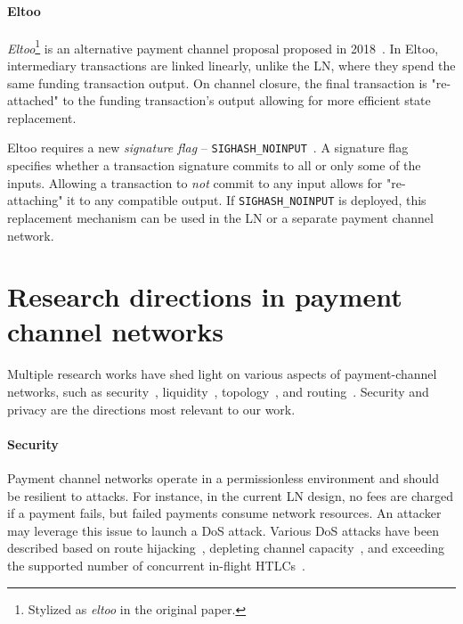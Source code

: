 \paragraph{Eltoo}

\textit{Eltoo}\footnote{Stylized as \textit{eltoo} in the original paper.} is an alternative payment channel proposal proposed in 2018~\cite{Decker2018}.
In Eltoo, intermediary transactions are linked linearly, unlike the LN, where they spend the same funding transaction output.
On channel closure, the final transaction is "re-attached" to the funding transaction's output allowing for more efficient state replacement.

Eltoo requires a new \textit{signature flag} -- \texttt{SIGHASH\_NOINPUT}~\cite{Decker2017}.
A signature flag specifies whether a transaction signature commits to all or only some of the inputs.
Allowing a transaction to \textit{not} commit to any input allows for "re-attaching" it to any compatible output.
If \texttt{SIGHASH\_NOINPUT} is deployed, this replacement mechanism can be used in the LN or a separate payment channel network.


\section{Research directions in payment channel networks}

Multiple research works have shed light on various aspects of payment-channel networks, such as security~\cite{Malavolta2019, Kiayias2019}, liquidity~\cite{Dandekar2011, MorenoSanchez2018, Conoscenti2019}, topology~\cite{Martinazzi2019, Seres2019}, and routing~\cite{Engelmann2017, Prihodko2016, Malavolta2017a, Grunspan2018, Osuntokun2018, Piatkivskyi2018, Roos2018, Sivaraman2018, Bagaria2019, Pickhardt2019, Pickhardt2019a, ZmnSCPxj2019, ZmnSCPxj2019a, ZmnSCPxj2019b}.
Security and privacy are the directions most relevant to our work.

\paragraph{Security}
Payment channel networks operate in a permissionless environment and should be resilient to attacks.
For instance, in the current LN design, no fees are charged if a payment fails, but failed payments consume network resources.
An attacker may leverage this issue to launch a DoS attack.
Various DoS attacks have been described based on route hijacking~\cite{Tochner2019}, depleting channel capacity~\cite{PerezSola2019}, and exceeding the supported number of concurrent in-flight HTLCs~\cite{Mizrahi2020}.

